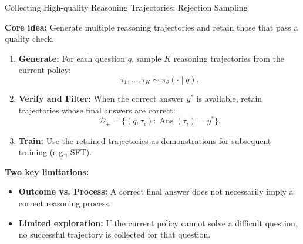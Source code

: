 \documentclass[aspectratio=169]{beamer}
\begin{document}
\begin{frame}{Collecting High-quality Reasoning Trajectories: Rejection Sampling}

\textbf{Core idea:} Generate multiple reasoning trajectories and retain those that pass a quality check.

\begin{enumerate}
    \item \textbf{Generate:} For each question $q$, sample $K$ reasoning trajectories from the current policy:
    \[
    \tau_1,\ldots,\tau_K \sim \pi_\theta(\cdot \mid q).
    \]

    \item \textbf{Verify and Filter:} When the correct answer $y^*$ is available, retain trajectories whose final answers are correct:
    \[
    \mathcal{D}_+ =
    \{(q,\tau_i): \operatorname{Ans}(\tau_i)=y^*\}.
    \]

    \item \textbf{Train:} Use the retained trajectories as demonstrations for subsequent training (e.g., SFT).
\end{enumerate}

\textbf{Two key limitations:}
\begin{itemize}
    \item \textbf{Outcome vs. Process:} A correct final answer does not necessarily imply a correct reasoning process.
    \item \textbf{Limited exploration:} If the current policy cannot solve a difficult question, no successful trajectory is collected for that question.
\end{itemize}

\end{frame}
\end{document}
